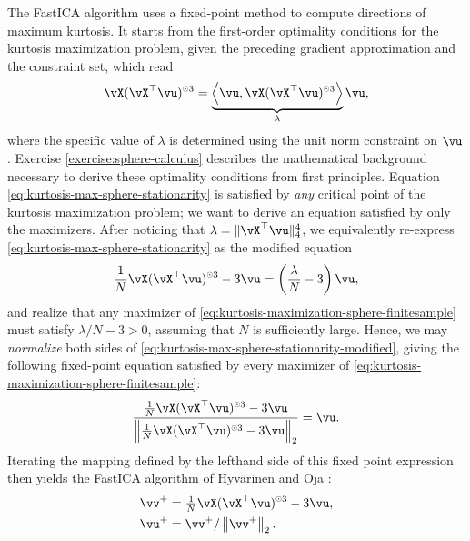 \documentclass[../../book-main.tex]{subfiles}
\begin{document}
The FastICA algorithm uses a fixed-point method to compute directions of maximum kurtosis. It starts from the first-order optimality conditions for the kurtosis maximization problem, given the preceding gradient approximation and the constraint set, which read
\begin{align}\label{eq:kurtosis-max-sphere-stationarity}
   \vX (\vX^\top \vu)^{\hada 3} 
   = 
   \underbrace{
   \ip*{\vu}{
   \vX (\vX^\top \vu)^{\hada 3} 
   }}_{\lambda} \vu,
\end{align}
where the specific value of $\lambda$ is determined using the unit norm constraint on $\vu$.
Exercise \ref{exercise:sphere-calculus} describes the mathematical background necessary to derive these optimality conditions from first principles.
Equation \eqref{eq:kurtosis-max-sphere-stationarity} is satisfied by \textit{any} critical point of the kurtosis maximization problem; we want to derive an equation satisfied by only the maximizers.
After noticing that $\lambda = \norm{\vX^\top \vu}_4^4$, we equivalently re-express \eqref{eq:kurtosis-max-sphere-stationarity} as the modified equation
\begin{align}\label{eq:kurtosis-max-sphere-stationarity-modified}
   \frac{1}{N}\vX (\vX^\top \vu)^{\hada 3} 
   - 
   3 \vu
   = 
   \left(
   \frac{\lambda}{N} - 3
   \right)
   \vu,
\end{align}
and realize that any maximizer of \eqref{eq:kurtosis-maximization-sphere-finitesample} 
must satisfy $\lambda / N - 3 > 0$,
assuming that $N$ is sufficiently large.
Hence, we may \textit{normalize} both sides of \eqref{eq:kurtosis-max-sphere-stationarity-modified},
giving the following fixed-point equation satisfied by every maximizer of \eqref{eq:kurtosis-maximization-sphere-finitesample}:
\begin{align}\label{eq:kurtosis-max-sphere-fxp}
\frac{
   \frac{1}{N}\vX (\vX^\top \vu)^{\hada 3} 
   - 
   3 \vu
   }{
   \norm*{
   \frac{1}{N}\vX (\vX^\top \vu)^{\hada 3} 
   - 
   3 \vu
   }_2
   }
   =
   \vu.
\end{align}
Iterating the mapping defined by the lefthand side of this fixed point expression then yields the FastICA algorithm of Hyv\"{a}rinen and Oja \cite{hyvarinen-1997}:
\begin{equation}
\begin{split}\label{eq:fast-ica}
   \vv^+ &= \tfrac{1}{N}\vX (\vX^\top \vu)^{\hada 3}- 3 \vu
   ,  \\
   \vu^+ &= \vv^+ / \norm*{\vv^+}_2.
   \end{split}
\end{equation}
\end{document}
